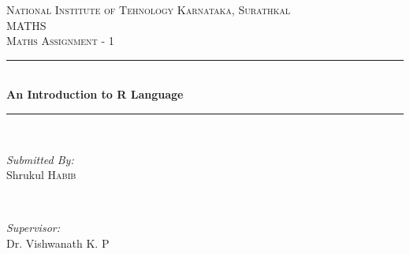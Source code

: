 \begin{titlepage}

\newcommand{\HRule}{\rule{\linewidth}{0.5mm}} %

\center %
 

\textsc{\LARGE National Institute of Tehnology Karnataka, Surathkal}\\[1.5cm] %
\textsc{\Large MATHS}\\[0.5cm] %
\textsc{\large Maths Assignment - 1}\\[0.5cm] %


\HRule \\[0.4cm]
{ \huge \bfseries An Introduction to R Language}\\[0.4cm] %
\HRule \\[1.5cm]
 

\begin{minipage}{0.4\textwidth}
\begin{flushleft} \large
\emph{Submitted By:}\\
Shrukul \textsc{Habib} %
\end{flushleft}
\end{minipage}
~
\begin{minipage}{0.4\textwidth}
\begin{flushright} \large
\emph{Supervisor:} \\
Dr. Vishwanath \textsc{K. P} %
\end{flushright}
\end{minipage}\\[2cm]



\end{titlepage}
